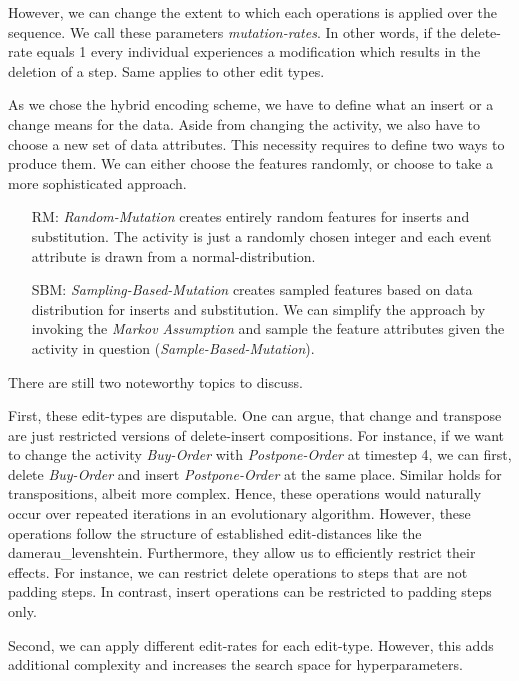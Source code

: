 \documentclass[./../../paper.tex]{subfiles}
\begin{document}
However, we can change the extent to which each operations is applied over the sequence. We call these parameters \emph{mutation-rates}. In other words, if the delete-rate equals 1 every individual experiences a modification which results in the deletion of a step. Same applies to other edit types.

As we chose the hybrid encoding scheme, we have to define what an insert or a change means for the data. Aside from changing the activity, we also have to choose a new set of data attributes. This necessity requires to define two ways to produce them. We can either choose the features randomly, or choose to take a more sophisticated  approach.

\begin{enumerate}
    \item[RM:] \emph{Random-Mutation} creates entirely random features for inserts and substitution. The activity is just a randomly chosen integer and each event attribute is drawn from a normal-distribution.
    \item[SBM:] \emph{Sampling-Based-Mutation} creates sampled features based on data distribution for inserts and substitution. We can simplify the approach by invoking the \emph{Markov Assumption} and sample the feature attributes given the activity in question (\emph{Sample-Based-Mutation}).

\end{enumerate}

There are still two noteworthy topics to discuss.

First, these edit-types are disputable. One can argue, that change and transpose are just restricted versions of delete-insert compositions. For instance, if we want to change the activity \emph{Buy-Order} with \emph{Postpone-Order} at timestep 4, we can first, delete \emph{Buy-Order} and insert \emph{Postpone-Order} at the same place. Similar holds for transpositions, albeit more complex. Hence, these operations would naturally occur over repeated iterations in an evolutionary algorithm. However, these operations follow the structure of established edit-distances like the \gls{damerau_levenshtein}. Furthermore, they allow us to efficiently restrict their effects. For instance, we can restrict delete operations to steps that are not padding steps. In contrast, insert operations can be restricted to padding steps only.

Second, we can apply different edit-rates for each edit-type. However, this adds additional complexity and increases the search space for hyperparameters.
\end{document}
